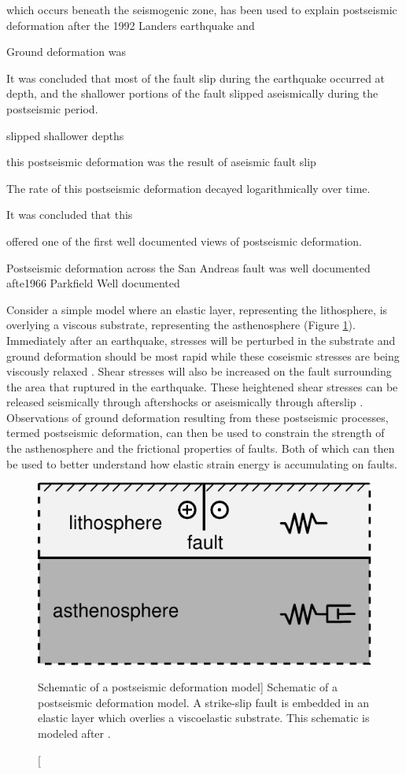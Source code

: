 which occurs beneath the seismogenic zone, has been used to
explain postseismic deformation after the 1992 Landers earthquake
\citep{Shen1994} and



Ground deformation was  

It was concluded that most of
the fault slip during the earthquake occurred at depth, and the
shallower portions of the fault slipped aseismically during the
postseismic period.

slipped shallower depths

this
postseismic deformation was the result of aseismic fault slip

The rate of this postseismic deformation decayed logarithmically over time.

It was concluded that this

 offered one of the
first well documented views of postseismic deformation.

Postseismic deformation across the San Andreas
fault was well documented afte1966 Parkfield Well documented

Consider a simple model where an elastic layer, representing the
lithosphere, is overlying a viscous substrate, representing the
asthenosphere (Figure \ref{intro:fig:1}). Immediately after an
earthquake, stresses will be perturbed in the substrate and ground
deformation should be most rapid while these coseismic stresses are
being viscously relaxed \citep{Nur1974,Savage1978}. Shear stresses
will also be increased on the fault surrounding the area that ruptured
in the earthquake. These heightened shear stresses can be released
seismically through aftershocks or aseismically through afterslip
\citep{Marone1991}. Observations of ground deformation resulting from
these postseismic processes, termed postseismic deformation, can then
be used to constrain the strength of the asthenosphere and the
frictional properties of faults. Both of which can then be used to
better understand how elastic strain energy is accumulating on faults.

\begin{figure}
\includegraphics{schematic}
\caption
[Schematic of a postseismic deformation model]
{Schematic of a postseismic deformation model. A strike-slip fault is
embedded in an elastic layer which overlies a viscoelastic substrate.
This schematic is modeled after \citep{Savage1978}.}
\label{intro:fig:1}
\end{figure}

